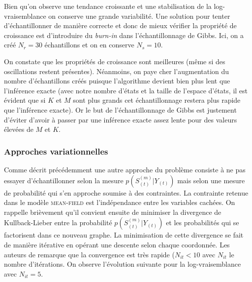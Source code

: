 \documentclass[10pt,a4paper]{article}
\newcommand{\meanfield}{\textsc{mean-field}}
\begin{document}
  Bien qu'on observe une tendance croissante et une stabilisation de la 
log-vraisemblance on conserve une grande variabilité.
Une solution pour tenter d'échantillonner de manière correcte et donc de mieux
vérifier la propriété de croissance est d'introduire du \textit{burn-in} dans
l'échantillonnage de Gibbs.
Ici, on a créé $N_r = 30$ échantillons et on en conserve $N_s = 10$.

On constate que les propriétés de croissance sont meilleures (même si des 
oscillations restent présentes). Néanmoins, on paye cher l'augmentation du 
nombre d'échantillons créés puisque l'algorithme devient bien plus lent que 
l'inférence exacte (avec notre nombre d'états et la taille de l'espace d'états, 
il est évident que si $K$ et $M$ sont plus grands cet échantillonnage restera 
plus rapide que l'inférence exacte). Or le but de l'échantillonnage de Gibbs 
est justement d'éviter d'avoir à passer par une inférence exacte assez lente 
pour des valeurs élevées de $M$ et $K$.
\subsubsection{Approches variationnelles}
Comme décrit précédemment une autre approche du problème consiste à ne pas 
essayer d'échantillonner selon la mesure $p(S_{(t)}^{(m)} \vert Y_{(t)})$ mais 
selon une mesure de probabilité qui s'en approche soumise à des contraintes. La 
contrainte retenue dans le modèle \meanfield{} est l'indépendance entre les 
variables cachées. On rappelle brièvement qu'il convient ensuite de minimiser 
la divergence de Kullback-Lieber entre la probabilité $p(S_{(t)}^{(m)} \vert 
Y_{(t)})$ et les probabilités qui se factorisent dans ce nouveau graphe. La 
minimisation de cette divergence se fait de manière itérative en opérant une 
descente selon chaque coordonnée. Les auteurs de \cite{ghahramani1997factorial} 
remarque que la convergence est très rapide ($N_{it}< 10$ avec $N_{it}$ le 
nombre d'itérations. On observe l'évolution suivante pour la log-vraisemblance 
avec $N_{it} = 5$.
\end{document}
